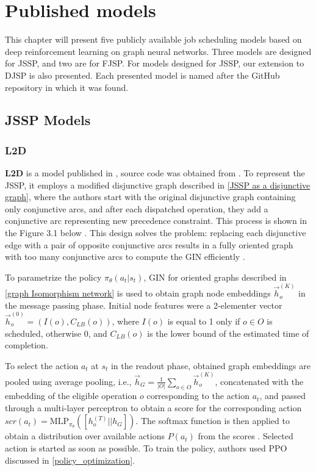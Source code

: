 \chapter{Published models}

This chapter will present five publicly available job scheduling models based on deep reinforcement learning on graph neural networks. Three models are designed for JSSP, and two are for FJSP. For models designed for JSSP, our extension to DJSP is also presented. Each presented model is named after the GitHub repository in which it was found. 

\section{JSSP Models}

\subsection{L2D}
\textbf{L2D} is a model published in \cite{zhang2020learning}, source code was obtained from \cite{github_l2d}. To represent the JSSP, it employs a modified disjunctive graph described in \ref{JSSP as a disjunctive graph}, where the authors start with the original disjunctive graph containing only conjunctive arcs, and after each dispatched operation, they add a conjunctive arc representing new precedence constraint. This process is shown in the Figure 3.1 below \cite{zhang2020learning}. This design solves the problem: replacing each disjunctive edge with a pair of opposite conjunctive arcs results in a fully oriented graph with too many conjunctive arcs to compute the GIN efficiently \cite{zhang2020learning}.
\par
To parametrize the policy $\pi_\theta(a_t|s_t)$, GIN for oriented graphs described in \ref{graph Isomorphism network} is used to obtain graph node embeddings $\vec{h}_o^{(K)}$ in the message passing phase. Initial node features were a 2-elementer vector $\vec{h}_o^{(0)} = (I(o), C_{LB}(o))$, where $I(o)$ is equal to 1 only if $o \in O$ is scheduled, otherwise 0, and $C_{LB}(o)$ is the lower bound of the estimated time of completion. 
\par
To select the action $a_t$ at $s_t$ in the readout phase, obtained graph embeddings are pooled using average pooling, i.e., $\vec{h}_G = \frac{1}{|O|} \sum_{o \in O} \vec{h}_o^{(K)}$, concatenated with the embedding of the eligible operation $o$ corresponding to the action $a_t$, and passed through a multi-layer perceptron to obtain a score for the corresponding action $scr(a_t) = \text{MLP}_{\pi_\theta}\left ( \left [h_o^{(T)} || h_G \right ] \right )$. The softmax function is then applied to obtain a distribution over available actions $P(a_t)$ from the scores \cite{zhang2020learning}. Selected action is started as soon as possible. To train the policy, authors used PPO discussed in \ref{policy_optimization}.
